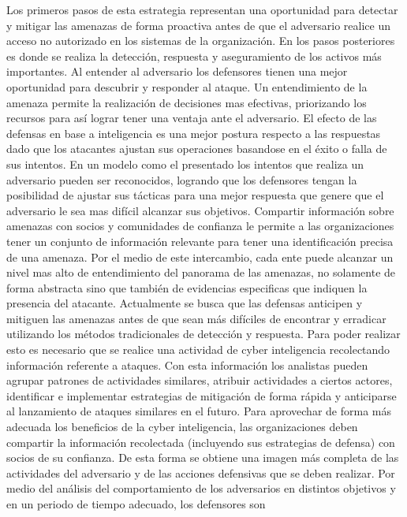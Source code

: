Los primeros pasos de esta estrategia representan una 
oportunidad para detectar y mitigar las amenazas de forma proactiva antes de que 
el adversario realice un acceso no autorizado en los sistemas de la 
organización. En los pasos posteriores es donde se realiza la detección, 
respuesta y aseguramiento de los activos más importantes. Al entender al 
adversario los defensores tienen una mejor oportunidad para descubrir y 
responder al ataque. Un entendimiento de la amenaza permite la realización de 
decisiones mas efectivas, priorizando los recursos para así lograr tener una 
ventaja ante el adversario. El efecto de las defensas en base a inteligencia es 
una mejor postura respecto a las respuestas dado que los atacantes 
ajustan sus operaciones basandose en el éxito o falla de sus intentos. En un 
modelo como el presentado los intentos que realiza un adversario pueden ser 
reconocidos, logrando que los defensores tengan la posibilidad de ajustar sus 
tácticas para una mejor respuesta que genere que el adversario le sea mas 
difícil alcanzar sus objetivos. Compartir información sobre amenazas con socios 
y comunidades de confianza le permite a las organizaciones tener un conjunto de 
información relevante para tener una identificación precisa de una amenaza.
Por el medio de este intercambio, cada ente puede alcanzar un nivel mas alto de 
entendimiento del panorama de las amenazas, no solamente de forma abstracta sino 
que también de evidencias especificas que indiquen la presencia del atacante.
Actualmente se busca que las defensas anticipen y mitiguen 
las amenazas antes de que sean más difíciles de encontrar y erradicar utilizando 
los métodos tradicionales de detección y respuesta. Para poder realizar esto es 
necesario que se realice una actividad de cyber inteligencia recolectando 
información referente a ataques. Con esta información los analistas pueden 
agrupar patrones de actividades similares, atribuir actividades a ciertos 
actores, identificar e implementar estrategias de mitigación de forma rápida y 
anticiparse al lanzamiento de ataques similares en el futuro. Para aprovechar de 
forma más adecuada los beneficios de la cyber inteligencia, las organizaciones 
deben compartir la información recolectada (incluyendo sus estrategias de defensa) 
con socios de su confianza. De esta forma se obtiene una imagen más completa de 
las actividades del adversario y de las acciones defensivas que se deben 
realizar. Por medio del análisis del comportamiento de los adversarios en 
distintos objetivos y en un periodo de tiempo adecuado, los defensores son 
